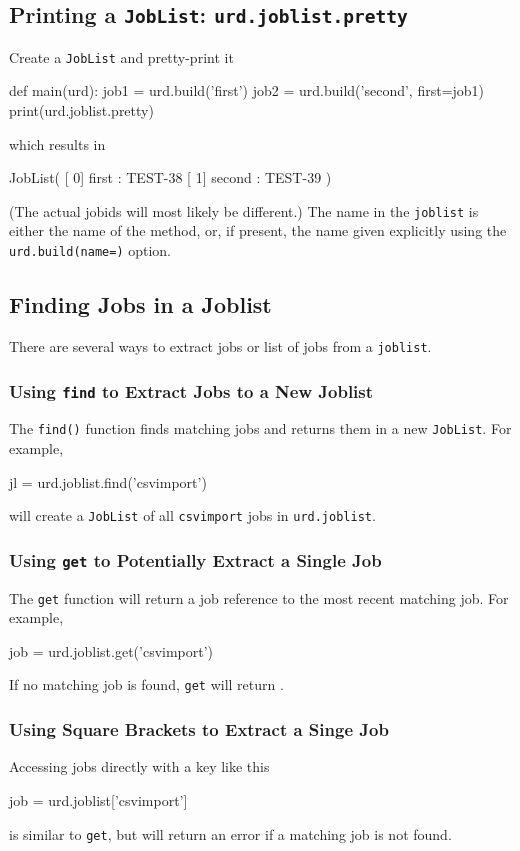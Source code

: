 \subsection{Printing a \texttt{JobList}:  \texttt{urd.joblist.pretty}}
Create a \texttt{JobList} and pretty-print it
\begin{python}
def main(urd):
    job1 = urd.build('first')
    job2 = urd.build('second', first=job1)
    print(urd.joblist.pretty)
\end{python}
which results in
\begin{shell}
JobList(
   [  0]  first : TEST-38
   [  1] second : TEST-39
)
\end{shell}
(The actual jobids will most likely be different.)  The name in
the \texttt{joblist} is either the name of the method, or, if present,
the name given explicitly using the \texttt{urd.build(name=)} option.



\subsection{Finding Jobs in a Joblist}
There are several ways to extract jobs or list of jobs from
a \texttt{joblist}.


\subsubsection*{Using \texttt{find} to Extract Jobs to a New Joblist}
The \texttt{find()} function finds matching jobs and returns them in a
new \texttt{JobList}.  For example,
\begin{python}
jl = urd.joblist.find('csvimport')
\end{python}
will create a \texttt{JobList} of all \texttt{csvimport} jobs
in \texttt{urd.joblist}.


\subsubsection*{Using \texttt{get} to Potentially Extract a Single Job}
The \texttt{get} function will return a job reference to the most
recent matching job.  For example,
\begin{python}
job = urd.joblist.get('csvimport')
\end{python}
If no matching job is found, \texttt{get} will return \pyNone.


\subsubsection*{Using Square Brackets to Extract a Singe Job}
Accessing jobs directly with a key like this
\begin{python}
job = urd.joblist['csvimport']
\end{python}
is similar to \texttt{get}, but will return an error if a matching job
is not found.


